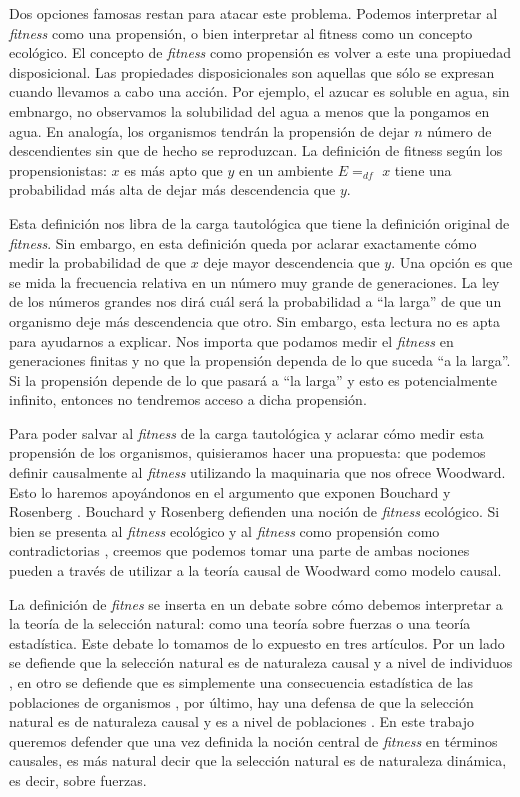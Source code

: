 Dos opciones famosas restan para atacar este problema. Podemos interpretar al \emph{fitness} como una propensión, o bien interpretar al fitness como un concepto ecológico. El concepto de \emph{fitness} como propensión es volver a este una propiuedad disposicional. Las propiedades disposicionales son aquellas que sólo se expresan cuando llevamos a cabo una acción. Por ejemplo, el azucar es soluble en agua, sin embnargo, no observamos la solubilidad del agua a menos que la pongamos en agua. En analogía, los organismos tendrán la propensión de dejar $n$ número de descendientes sin que de hecho se reproduzcan. La definición de fitness según los propensionistas: $x$ es más apto que $y$ en un ambiente $E =_{df}$ $x$ tiene una probabilidad más alta de dejar más descendencia que $y$.

Esta definición nos libra de la carga tautológica que tiene la definición original de \emph{fitness}. Sin embargo, en esta definición queda por aclarar exactamente cómo medir la probabilidad de que $x$ deje mayor descendencia que $y$. Una opción es que se mida la frecuencia relativa en un número muy grande de generaciones. La ley de los números grandes nos dirá cuál será la probabilidad a ``la larga'' de que un organismo deje más descendencia que otro. Sin embargo, esta lectura no es apta para ayudarnos a explicar. Nos importa que podamos medir el \emph{fitness} en generaciones finitas y no que la propensión dependa de lo que suceda ``a la larga''. Si la propensión depende de lo que pasará a ``la larga'' y esto es potencialmente infinito, entonces no tendremos acceso a dicha propensión.

Para poder salvar al \emph{fitness} de la carga tautológica y aclarar cómo medir esta propensión de los organismos,  quisieramos hacer una propuesta: que podemos definir causalmente al \emph{fitness} utilizando la maquinaria que nos ofrece Woodward. Esto lo haremos apoyándonos en el argumento que exponen Bouchard y Rosenberg \cite{Bouchard2004}. Bouchard y Rosenberg defienden una noción de \emph{fitness} ecológico. Si bien se presenta al \emph{fitness} ecológico y al \emph{fitness} como propensión como contradictorias \cite{sep-fitness}, creemos que podemos tomar una parte de ambas nociones pueden a través de utilizar a la teoría causal de Woodward como modelo causal.

La definición de \emph{fitnes} se inserta en un debate sobre cómo debemos interpretar a la teoría de la selección natural: como una teoría sobre fuerzas o una teoría estadística. Este debate lo tomamos de lo expuesto en tres artículos. Por un lado se defiende que la selección natural es de naturaleza causal y a nivel de individuos \cite{Bouchard2004}, en otro se defiende que es simplemente una consecuencia estadística de las poblaciones de organismos \cite{Walsh2002}, por último, hay una defensa de que la selección natural es de naturaleza causal y es a nivel de poblaciones \cite{Millstein2006}. En este trabajo queremos defender que una vez definida la noción central de \emph{fitness} en términos causales, es más natural decir que la selección natural es de naturaleza dinámica, es decir, sobre fuerzas.

